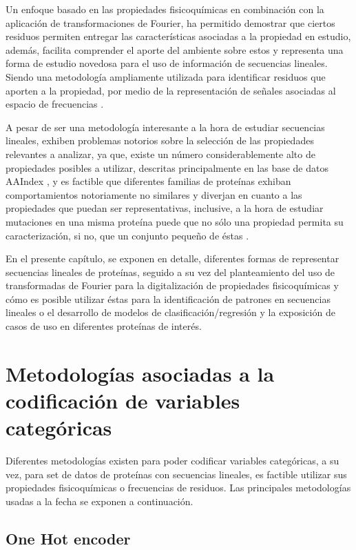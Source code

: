 Un enfoque basado en las propiedades fisicoquímicas en combinación con la aplicación de transformaciones de Fourier, ha permitido demostrar que ciertos residuos permiten entregar las características asociadas a la propiedad en estudio, además, facilita comprender el aporte del ambiente sobre estos y representa una forma de estudio novedosa para el uso de información de secuencias lineales. Siendo una metodología ampliamente utilizada para identificar residuos que aporten a la propiedad, por medio de la representación de señales asociadas al espacio de frecuencias \cite{veljkovic1985possible, cosic2016analysis, cadet2018application}.

A pesar de ser una metodología interesante a la hora de estudiar secuencias lineales, exhiben problemas notorios sobre la selección de las propiedades relevantes a analizar, ya que, existe un número considerablemente alto de propiedades posibles a utilizar, descritas principalmente en las base de datos AAIndex \cite{Kawashima2000}, y es factible que diferentes familias de proteínas exhiban comportamientos notoriamente no similares y diverjan en cuanto a las propiedades que puedan ser representativas, inclusive, a la hora de estudiar mutaciones en una misma proteína puede que no sólo una propiedad permita su caracterización, si no, que un conjunto pequeño de éstas \cite{cadet2018application}.

En el presente capítulo, se exponen en detalle, diferentes formas de representar secuencias lineales de proteínas, seguido a su vez del planteamiento del uso de transformadas de Fourier para la digitalización de propiedades fisicoquímicas y cómo es posible utilizar éstas para la identificación de patrones en secuencias lineales o el desarrollo de modelos de clasificación/regresión y la exposición de casos de uso en diferentes proteínas de interés. 

\section{Metodologías asociadas a la codificación de variables categóricas}

Diferentes metodologías existen para poder codificar variables categóricas, a su vez, para set de datos de proteínas con secuencias lineales, es factible utilizar sus propiedades fisicoquímicas o frecuencias de residuos. Las principales metodologías usadas a la fecha se exponen a continuación.

\subsection{One Hot encoder}

